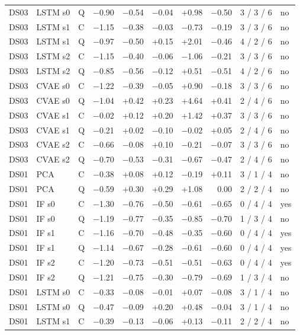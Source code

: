 \documentclass[10pt]{article}
\begin{document}
{\begin{longtable}{lllrrrrrcl}
DS03 & LSTM s0 & Q & −0.90 & −0.54 & −0.04 & +0.98 & −0.50 & 3 / 3 / 6 & no \\
DS03 & LSTM s1 & C & −1.15 & −0.38 & −0.03 & −0.73 & −0.19 & 3 / 3 / 6 & no \\
DS03 & LSTM s1 & Q & −0.97 & −0.50 & +0.15 & +2.01 & −0.46 & 4 / 2 / 6 & no \\
DS03 & LSTM s2 & C & −1.15 & −0.40 & −0.06 & −1.06 & −0.21 & 3 / 3 / 6 & no \\
DS03 & LSTM s2 & Q & −0.85 & −0.56 & −0.12 & +0.51 & −0.51 & 4 / 2 / 6 & no \\
DS03 & CVAE s0 & C & −1.22 & −0.39 & −0.05 & +0.90 & −0.18 & 3 / 3 / 6 & no \\
DS03 & CVAE s0 & Q & −1.04 & +0.42 & +0.23 & +4.64 & +0.41 & 2 / 4 / 6 & no \\
DS03 & CVAE s1 & C & −0.02 & +0.12 & +0.20 & +1.42 & +0.37 & 3 / 3 / 6 & no \\
DS03 & CVAE s1 & Q & −0.21 & +0.02 & −0.10 & −0.02 & +0.05 & 2 / 4 / 6 & no \\
DS03 & CVAE s2 & C & −0.66 & −0.08 & +0.10 & −0.21 & −0.07 & 3 / 3 / 6 & no \\
DS03 & CVAE s2 & Q & −0.70 & −0.53 & −0.31 & −0.67 & −0.47 & 2 / 4 / 6 & no \\
\midrule
DS01 & PCA & C & −0.38 & +0.08 & +0.12 & −0.19 & +0.11 & 3 / 1 / 4 & no \\
DS01 & PCA & Q & −0.59 & +0.30 & +0.29 & +1.08 & 0.00 & 2 / 2 / 4 & no \\
DS01 & IF s0 & C & −1.30 & −0.76 & −0.50 & −0.61 & −0.65 & 0 / 4 / 4 & yes \\
DS01 & IF s0 & Q & −1.19 & −0.77 & −0.35 & −0.85 & −0.70 & 1 / 3 / 4 & no \\
DS01 & IF s1 & C & −1.16 & −0.70 & −0.48 & −0.35 & −0.60 & 0 / 4 / 4 & yes \\
DS01 & IF s1 & Q & −1.14 & −0.67 & −0.28 & −0.61 & −0.60 & 0 / 4 / 4 & yes \\
DS01 & IF s2 & C & −1.20 & −0.73 & −0.51 & −0.51 & −0.63 & 0 / 4 / 4 & yes \\
DS01 & IF s2 & Q & −1.21 & −0.75 & −0.30 & −0.79 & −0.69 & 1 / 3 / 4 & no \\
DS01 & LSTM s0 & C & −0.33 & −0.08 & −0.01 & +0.07 & −0.08 & 3 / 1 / 4 & no \\
DS01 & LSTM s0 & Q & −0.47 & −0.09 & +0.20 & +0.48 & −0.04 & 3 / 1 / 4 & no \\
DS01 & LSTM s1 & C & −0.39 & −0.13 & −0.06 & +0.13 & −0.11 & 2 / 2 / 4 & no \\

\end{longtable}}
\end{document}
